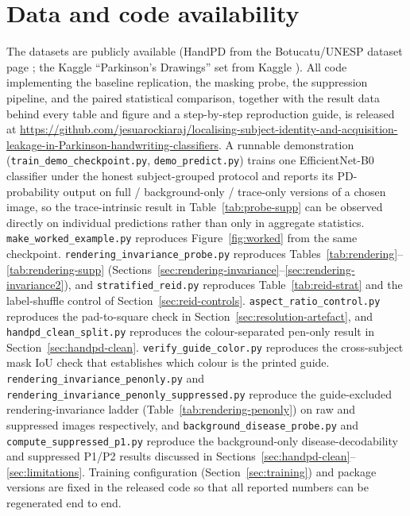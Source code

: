 \documentclass[3p,final,10pt]{elsarticle}
\let\oldsection\section
\renewcommand{\section}{\FloatBarrier\oldsection}
\begin{document}
\section*{Data and code availability}
The datasets are publicly available (HandPD from the Botucatu/UNESP dataset
page \cite{pereira2015}; the Kaggle ``Parkinson's Drawings'' set from Kaggle
\cite{zham2017}). All code implementing the baseline replication, the
masking probe, the suppression pipeline, and the paired statistical
comparison, together with the result data behind every table and figure and
a step-by-step reproduction guide, is released at
\url{https://github.com/jesuarockiaraj/localising-subject-identity-and-acquisition-leakage-in-Parkinson-handwriting-classifiers}.
A runnable demonstration
(\texttt{train\_demo\_checkpoint.py}, \texttt{demo\_predict.py}) trains one
EfficientNet-B0 classifier under the honest subject-grouped protocol and
reports its PD-probability output on full / background-only / trace-only
versions of a chosen image, so the trace-intrinsic result in
Table~\ref{tab:probe-supp} can be observed directly on individual
predictions rather than only in aggregate statistics.
\texttt{make\_worked\_example.py} reproduces Figure~\ref{fig:worked} from
the same checkpoint. \texttt{rendering\_invariance\_probe.py} reproduces
Tables~\ref{tab:rendering}--\ref{tab:rendering-supp}
(Sections~\ref{sec:rendering-invariance}--\ref{sec:rendering-invariance2}),
and \texttt{stratified\_reid.py} reproduces Table~\ref{tab:reid-strat} and
the label-shuffle control of Section~\ref{sec:reid-controls}.
\texttt{aspect\_ratio\_control.py} reproduces the pad-to-square check in
Section~\ref{sec:resolution-artefact}, and \texttt{handpd\_clean\_split.py}
reproduces the colour-separated pen-only result in
Section~\ref{sec:handpd-clean}. \texttt{verify\_guide\_color.py} reproduces
the cross-subject mask IoU check that establishes which colour is the
printed guide. \texttt{rendering\_invariance\_penonly.py} and
\texttt{rendering\_invariance\_penonly\_suppressed.py} reproduce the
guide-excluded rendering-invariance ladder (Table~\ref{tab:rendering-penonly})
on raw and suppressed images respectively, and
\texttt{background\_disease\_probe.py} and \texttt{compute\_suppressed\_p1.py}
reproduce the background-only disease-decodability and suppressed P1/P2
results discussed in Sections~\ref{sec:handpd-clean}--\ref{sec:limitations}.
Training configuration (Section~\ref{sec:training})
and package versions are fixed in the released code so that all reported
numbers can be regenerated end to end.
\end{document}
